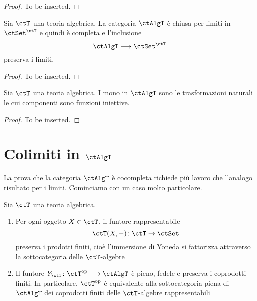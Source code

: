 \begin{proof}
	To be inserted.
\end{proof}

\begin{proposition}\label{prop_lim_AlgT}
	Sia \(\ctT\) una teoria algebrica. La categoria \(\ctAlgT\) è chiusa per limiti in \(\ctSet^{\ctT}\) e quindi è completa e l'inclusione
	\[
		\ctAlgT \fun \ctSet^{\ctT}
	\]
	preserva i limiti.
\end{proposition}

\begin{proof}
	To be inserted.
\end{proof}

\begin{corollary}\label{cor_mono_AlgT}
	Sia \(\ctT\) una teoria algebrica. I mono in \(\ctAlgT\) sono le trasformazioni naturali le cui componenti sono funzioni iniettive.
\end{corollary}

\begin{proof}
	To be inserted.
\end{proof}

\section{Colimiti in \(\ctAlgT\)}\label{sec_colim_AlgT}

La prova che la categoria \(\ctAlgT\) è cocompleta richiede più lavoro che l'analogo risultato per i limiti. Cominciamo con un caso
molto particolare.

\begin{proposition}\label{prop_Yoneda_alg}
	Sia \(\ctT\) una teoria algebrica.
	\begin{enumerate}
		\item Per ogni oggetto \(X \in \ctT\), il funtore rappresentabile
		      \[
			      \ctT(X,-) \colon \ctT \to \ctSet
		      \]
		      preserva i prodotti finiti, cioè l'immersione di Yoneda si fattorizza attraverso la sottocategoria delle \(\ctT\)-algebre
		      \(\)\(\)
		\item Il funtore \(Y_{\ctT} \colon \ctT^{\mathrm{op}} \fun \ctAlgT\) è pieno, fedele e preserva i coprodotti finiti. In particolare,
		      \(\ctT^{\mathrm{op}}\) è equivalente alla sottocategoria piena di \(\ctAlgT\) dei coprodotti finiti delle \(\ctT\)-algebre rappresentabili
	\end{enumerate}
\end{proposition}


